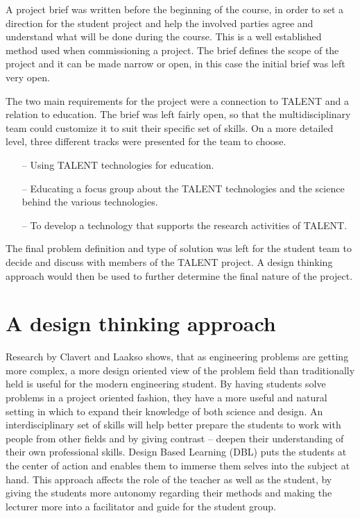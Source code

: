 \documentclass[english,12pt,a4paper,dvips]{article}
\begin{document}
A project brief was written before the beginning of the course, in order to set a direction for the student project and help the involved parties agree and understand what will be done during the course. This is a well established method used when commissioning a project. The brief defines the scope of the project and it can be made narrow or open, in this case the initial brief was left very open.

The two main requirements for the project were a connection to TALENT and a relation to education. The brief was left fairly open, so that the multidisciplinary team could customize it to suit their specific set of skills. On a more detailed level, three different tracks were presented for the team to choose.

\begin{itemize}
\item[--]Using TALENT technologies for education.
\item[--]Educating a focus group about the TALENT technologies and the science behind the various technologies.
\item[--]To develop a technology that supports the research activities of TALENT.
\end{itemize}

The final problem definition and type of solution was left for the student team to decide and discuss with members of the TALENT project. A design thinking approach would then be used to further determine the final nature of the project.


\clearpage

\section{A design thinking approach}

Research by Clavert and Laakso \cite{Clavert} shows, that as engineering problems are getting more complex, a more design oriented view of the problem field than traditionally held is useful for the modern engineering student. By having students solve problems in a project oriented fashion, they have a more useful and natural setting in which to expand their knowledge of both science and design. An interdisciplinary set of skills will help better prepare the students to work with people from other fields and by giving contrast -- deepen their understanding of their own professional skills. Design Based Learning (DBL) puts the students at the center of action and enables them to immerse them selves into the subject at hand. This approach affects the role of the teacher as well as the student, by giving the students more autonomy regarding their methods and making the lecturer more into a facilitator and guide for the student group.
\end{document}

